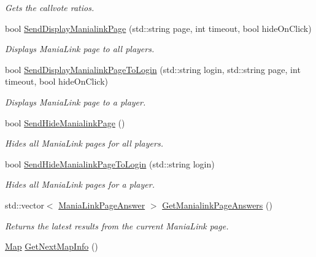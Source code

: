 \begin{DoxyCompactItemize}
\begin{DoxyCompactList}\small\item\em Gets the callvote ratios. \end{DoxyCompactList}\item 
bool \hyperlink{classMethods_ab04b0cae6a36c8202cabf1cd9ebc1a38}{Send\-Display\-Manialink\-Page} (std\-::string page, int timeout, bool hide\-On\-Click)
\begin{DoxyCompactList}\small\item\em Displays Mania\-Link page to all players. \end{DoxyCompactList}\item 
bool \hyperlink{classMethods_a39fd4b15b6f18a74fd686308319e5b51}{Send\-Display\-Manialink\-Page\-To\-Login} (std\-::string login, std\-::string page, int timeout, bool hide\-On\-Click)
\begin{DoxyCompactList}\small\item\em Displays Mania\-Link page to a player. \end{DoxyCompactList}\item 
\hypertarget{classMethods_aaf09c31b63f1eda2362ca24fd1b328ff}{bool \hyperlink{classMethods_aaf09c31b63f1eda2362ca24fd1b328ff}{Send\-Hide\-Manialink\-Page} ()}\label{classMethods_aaf09c31b63f1eda2362ca24fd1b328ff}

\begin{DoxyCompactList}\small\item\em Hides all Mania\-Link pages for all players. \end{DoxyCompactList}\item 
bool \hyperlink{classMethods_af5ec6746b209afdda796330dab55464a}{Send\-Hide\-Manialink\-Page\-To\-Login} (std\-::string login)
\begin{DoxyCompactList}\small\item\em Hides all Mania\-Link pages for a player. \end{DoxyCompactList}\item 
\hypertarget{classMethods_a43c84e59da7eb37e53bbd8f43299c454}{std\-::vector$<$ \hyperlink{structManiaLinkPageAnswer}{Mania\-Link\-Page\-Answer} $>$ \hyperlink{classMethods_a43c84e59da7eb37e53bbd8f43299c454}{Get\-Manialink\-Page\-Answers} ()}\label{classMethods_a43c84e59da7eb37e53bbd8f43299c454}

\begin{DoxyCompactList}\small\item\em Returns the latest results from the current Mania\-Link page. \end{DoxyCompactList}\item 
\hypertarget{classMethods_afa0e3e406c14aad10521d4d6c6333a70}{\hyperlink{structMap}{Map} \hyperlink{classMethods_afa0e3e406c14aad10521d4d6c6333a70}{Get\-Next\-Map\-Info} ()}\label{classMethods_afa0e3e406c14aad10521d4d6c6333a70}


\end{DoxyCompactItemize}
